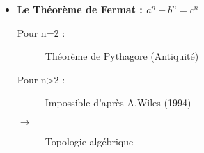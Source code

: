 \documentclass[8pt,a9paper]{beamer} \usepackage[utf8]{inputenc} \usepackage[francais]{babel} \usepackage[T1]{fontenc}
\begin{document}
\begin{frame}
\begin{columns}[t]
\begin{column}{6.4cm}
\begin{itemize}
\begin{description}
		\item[] 
		\end{description}
		\item \textbf{Le Théorème de Fermat : $a^n+b^n=c^n$}
		\begin{description}
		\item[Pour n=2 :] Théorème de Pythagore (Antiquité)
		\item[]	
		\item[Pour n>2 :] Impossible d'après A.Wiles (1994)
		\item[$\rightarrow$] Topologie algébrique
		\end{description}
		\end{itemize}
	\end{column}
	\end{columns} 
\end{frame}
\end{document}
